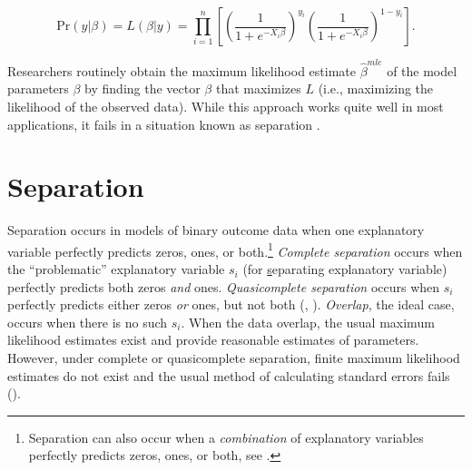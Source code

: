 \documentclass[12pt]{article}
\begin{document}
\begin{equation}\nonumber
\text{Pr}(y | \beta) = L(\beta | y) = \displaystyle \prod_{i = 1}^n \left[\left( \dfrac{1}{1 + e^{-X_i\beta}}\right)^{y_i}\left( \dfrac{1}{1 + e^{-X_i\beta}}\right)^{1 - y_i}\right]\text{.}
\end{equation}

%
%
%

Researchers routinely obtain the maximum likelihood estimate $\hat{\beta}^{mle}$ of the model parameters $\beta$ by finding the vector $\beta$ that maximizes $L$ (i.e., maximizing the likelihood of the observed data). While this approach works quite well in most applications, it fails in a situation known as separation \citep{Zorn2005}.

\section*{Separation}

Separation occurs in models of binary outcome data when one explanatory variable perfectly predicts zeros, ones, or both.\footnote{Separation can also occur when a \emph{combination} of explanatory variables perfectly predicts zeros, ones, or both, see \cite{LesaffreAlbert1989}.} \textit{Complete separation} occurs when the ``problematic'' explanatory variable $s_i$ (for \underline{s}eparating explanatory variable) perfectly predicts both zeros \emph{and} ones. \textit{Quasicomplete separation} occurs when $s_i$ perfectly predicts either zeros \emph{or} ones, but not both (\citealt{AlbertAnderson1984}, \citealt{Zorn2005}). \textit{Overlap}, the ideal case, occurs when there is no such $s_i$. When the data overlap, the usual maximum likelihood estimates exist and provide reasonable estimates of parameters. However, under complete or quasicomplete separation, finite maximum likelihood estimates do not exist and the usual method of calculating standard errors fails (\citealt{AlbertAnderson1984, Zorn2005}).
\end{document}

